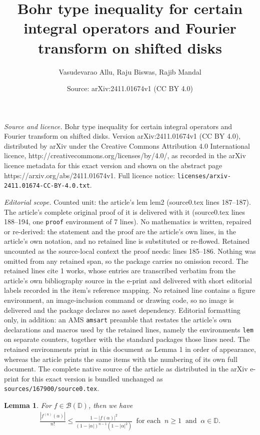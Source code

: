 \documentclass[10pt,a4paper]{amsart}
\title{Bohr type inequality for certain integral operators and Fourier transform on shifted disks}
\author{Vasudevarao Allu, Raju Biswas, Rajib Mandal}
\date{Source: arXiv:2411.01674v1 (CC BY 4.0)}
\newtheorem{lem}{Lemma}
\newcommand{\beas}{\begin{eqnarray*}}
\newcommand{\eeas}{\end{eqnarray*}}
\begin{document}
\maketitle

\noindent\emph{Source and licence.} Bohr type inequality for certain integral operators and Fourier transform on shifted disks. Version arXiv:2411.01674v1 (CC BY 4.0), distributed by arXiv under the Creative Commons Attribution 4.0 International licence, http://creativecommons.org/licenses/by/4.0/, as recorded in the arXiv licence metadata for this exact version and shown on the abstract page https://arxiv.org/abs/2411.01674v1. Full licence notice: \texttt{licenses/arxiv-2411.01674-CC-BY-4.0.txt}.\par\smallskip

\noindent\textit{Editorial scope.} Counted unit: the article's lem lem2 (source0.tex lines 187--187). The article's complete original proof of it is delivered with it (source0.tex lines 188--194, one \texttt{proof} environment of 7 lines). No mathematics is written, repaired or re-derived: the statement and the proof are the article's own lines, in the article's own notation, and no retained line is substituted or re-flowed.  Retained uncounted as the source-local context the proof needs: lines 185--186.  Nothing was omitted from any retained span, so the package carries no omission record.  The retained lines cite 1 works, whose entries are transcribed verbatim from the article's own bibliography source in the e-print and delivered with short editorial labels recorded in the item's reference mapping.  No retained line contains a figure environment, an image-inclusion command or drawing code, so no image is delivered and the package declares no asset dependency.  Editorial formatting only, in addition: an AMS \texttt{amsart} preamble that restates the article's own declarations and macros used by the retained lines, namely the environments \texttt{lem} on separate counters, together with the standard packages those lines need.  The retained environments print in this document as Lemma 1 in order of appearance, whereas the article prints the same items with the numbering of its own full document.  The complete native source of the article as distributed in the arXiv e-print for this exact version is bundled unchanged as \texttt{sources/167900/source0.tex}.
\begin{lem}\cite{26a}\label{lem1} For $f\in\mathcal{B}(\mathbb{D})$, then we have 
\beas \frac{\left|f^{(n)}(\alpha)\right|}{n!}\leq \frac{1-|f(\alpha)|^2}{(1-|\alpha|)^{n-1}(1-|\alpha|^2)}\;\;\text{for each}\;\; n\geq 1\;\;\text{and}\;\; \alpha\in\mathbb{D}.\eeas\end{lem}
\end{document}
